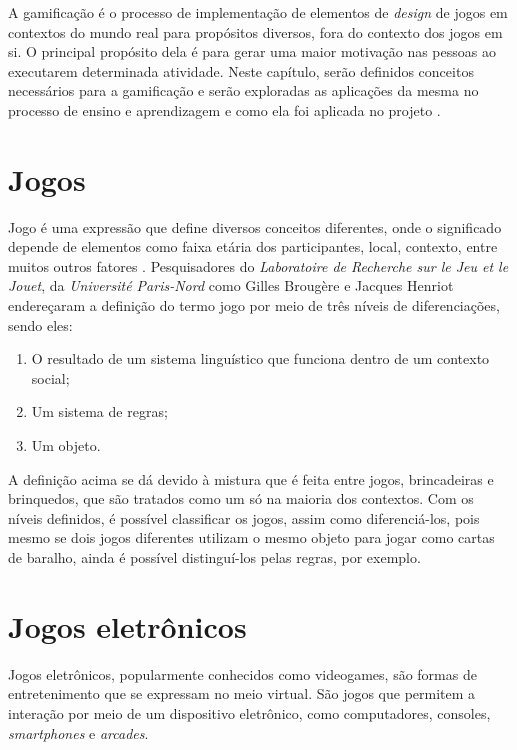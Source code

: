 A gamificação \cite{gamification_motivates} é o processo de implementação de elementos de \textit{design} de jogos em contextos do mundo real para propósitos diversos, fora do contexto dos jogos em si. O principal propósito dela é para gerar uma maior motivação nas pessoas ao executarem determinada atividade. Neste capítulo, serão definidos conceitos necessários para a gamificação e serão exploradas as aplicações da mesma no processo de ensino e aprendizagem e como ela foi aplicada no projeto \appName.

\section{Jogos}

Jogo é uma expressão que define diversos conceitos diferentes, onde o significado depende de elementos como faixa etária dos participantes, local, contexto, entre muitos outros fatores \cite{jogos}. Pesquisadores do \textit{Laboratoire de Recherche sur le Jeu et le Jouet}, da \textit{Université Paris-Nord} como Gilles Brougère \cite{gilles_jogos} e Jacques Henriot \cite{jacques_jeu} endereçaram a definição do termo jogo por meio de três níveis de diferenciações, sendo eles:

\begin{enumerate}
    \item O resultado de um sistema linguístico que funciona dentro de um contexto social;
    \item Um sistema de regras;
    \item Um objeto.
\end{enumerate}

A definição acima se dá devido à mistura que é feita entre jogos, brincadeiras e brinquedos, que são tratados como um só na maioria dos contextos. Com os níveis definidos, é possível classificar os jogos, assim como diferenciá-los, pois mesmo se dois jogos diferentes utilizam o mesmo objeto para jogar como cartas de baralho, ainda é possível distinguí-los pelas regras, por exemplo.

\section{Jogos eletrônicos}

Jogos eletrônicos, popularmente conhecidos como videogames, são formas de entretenimento que se expressam no meio virtual. São jogos que permitem a interação por meio de um dispositivo eletrônico, como computadores, consoles, \textit{smartphones} e \textit{arcades}.

